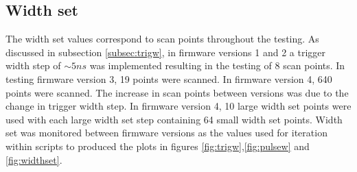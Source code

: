\subsection{Width set}\label{subsec:widthset}
The width set values correspond to scan points throughout the testing. As discussed in subsection \ref{subsec:trigw}, in firmware versions 1 and 2 a trigger width step of $\sim5ns$ was implemented resulting in the testing of 8 scan points. In testing firmware version 3, 19 points were scanned. In firmware version 4, 640 points were scanned. The increase in scan points between versions was due to the change in trigger width step. In firmware version 4, 10 large width set points were used with each large width set step containing 64 small width set points. Width set was monitored between firmware versions as the values used for iteration within scripts to produced the plots in figures \ref{fig:trigw},\ref{fig:pulsew} and \ref{fig:widthset}.
